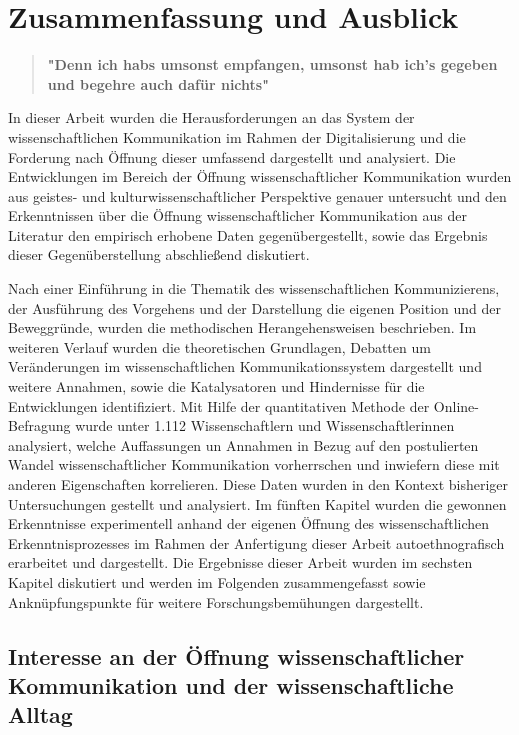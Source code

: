 \chapter{Zusammenfassung und Ausblick}

\begin{quote}
\textbf{"Denn ich habs umsonst empfangen, umsonst hab ich's gegeben und begehre auch dafür nichts"}
\end{quote} \cite{luther_1876}

In dieser Arbeit wurden die Herausforderungen an das System der wissenschaftlichen Kommunikation im Rahmen der Digitalisierung und die Forderung nach Öffnung dieser umfassend dargestellt und analysiert. Die Entwicklungen im Bereich der Öffnung wissenschaftlicher Kommunikation wurden aus geistes- und kulturwissenschaftlicher Perspektive genauer untersucht und den Erkenntnissen über die Öffnung wissenschaftlicher Kommunikation aus der Literatur den empirisch erhobene Daten gegenübergestellt, sowie das Ergebnis dieser Gegenüberstellung abschließend diskutiert.

Nach einer Einführung in die Thematik des wissenschaftlichen Kommunizierens, der Ausführung des Vorgehens und der Darstellung die eigenen Position und der Beweggründe, wurden die methodischen Herangehensweisen beschrieben. Im weiteren Verlauf wurden die theoretischen Grundlagen, Debatten um Veränderungen im wissenschaftlichen Kommunikationssystem dargestellt und weitere Annahmen, sowie die Katalysatoren und Hindernisse für die Entwicklungen identifiziert. Mit Hilfe der quantitativen Methode der Online-Befragung wurde unter 1.112 Wissenschaftlern und Wissenschaftlerinnen analysiert, welche Auffassungen un Annahmen in Bezug auf den postulierten Wandel wissenschaftlicher Kommunikation vorherrschen und inwiefern diese mit anderen Eigenschaften korrelieren. Diese Daten wurden in den Kontext bisheriger Untersuchungen gestellt und analysiert. Im fünften Kapitel wurden die gewonnen Erkenntnisse experimentell anhand der eigenen Öffnung des wissenschaftlichen Erkenntnisprozesses im Rahmen der Anfertigung dieser Arbeit autoethnografisch erarbeitet und dargestellt. Die Ergebnisse dieser Arbeit wurden im sechsten Kapitel diskutiert und werden im Folgenden zusammengefasst sowie Anknüpfungspunkte für weitere Forschungsbemühungen dargestellt.

\section{Interesse an der Öffnung wissenschaftlicher Kommunikation und der wissenschaftliche Alltag}

